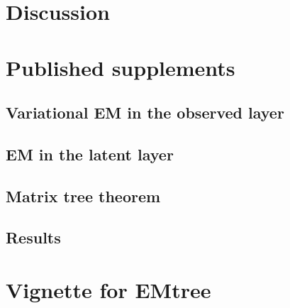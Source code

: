 \section{Discussion} 
\begin{subappendices}
\section{Published supplements}
\subsection{Variational EM in the observed layer} \label{app:VEM} 
\subsection{EM in the latent layer} \label{app:EM} 
\subsection{Matrix tree theorem}\label{app:MTT} 
\subsection{Results}\label{app:results} 
\section{Vignette for EMtree}
\end{subappendices}

